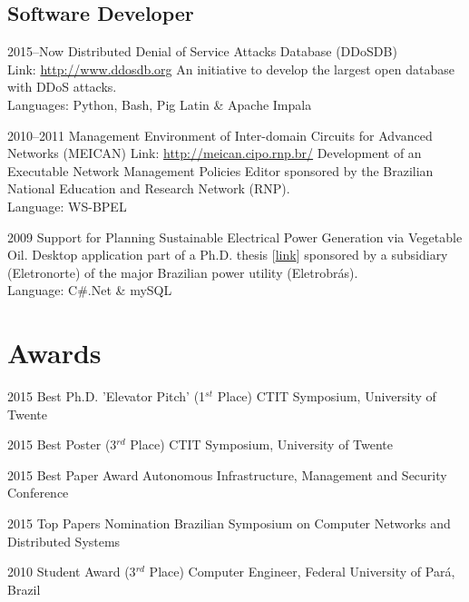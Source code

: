 \documentclass[print]{styles/friggeri-cv-linux} %
\begin{document}
\subsection{Software Developer}
\begin{entrylist}

\entry
{2015--Now}
{Distributed Denial of Service Attacks Database (DDoSDB)}
{\\Link: \href{http://ddosdb.org}{http://www.ddosdb.org} }
{An initiative to develop the largest open database with DDoS attacks.\\
Languages: Python, Bash, Pig Latin \& Apache Impala
}

\entry
{2010--2011}
{{Management Environment of Inter-domain Circuits for Advanced Networks (MEICAN)}}
{Link: \href{http://meican.cipo.rnp.br/}{http://meican.cipo.rnp.br/}}
{Development of an Executable Network Management Policies Editor sponsored by the Brazilian National Education and Research Network (RNP).    \\
Language: WS-BPEL
}

\entry
{2009}
{Support for Planning Sustainable Electrical Power Generation via Vegetable Oil.}
{}
{Desktop application part of a Ph.D. thesis [\href{https://sites.google.com/site/ceamazonufpa/TeseAnaRosaDuarte.pdf}{link}] sponsored by a subsidiary (Eletronorte) of the major Brazilian power utility (Eletrobrás).\\
Language: C\#.Net \& mySQL
}
\end{entrylist}

\section{Awards}

\begin{entrylist}
\vspace{-0.3cm}
\entry
{2015}
{Best Ph.D. 'Elevator Pitch' (1$^{st}$ Place)}
{CTIT Symposium, University of Twente}

\vspace{-0.3cm}
\entry
{2015}
{Best Poster (3$^{rd}$ Place)}
{CTIT Symposium, University of Twente}

\vspace{-0.3cm}
\entry
{2015}
{Best Paper Award}
{Autonomous Infrastructure, Management and Security Conference}

\vspace{-0.3cm}
\entry
{2015}
{Top Papers Nomination}
{Brazilian Symposium on Computer Networks and Distributed Systems}

\vspace{-0.3cm}
\entry
{2010}
{Student Award (3$^{rd}$ Place)}
{Computer Engineer, Federal University of Pará, Brazil}

\end{entrylist}
\end{document}

